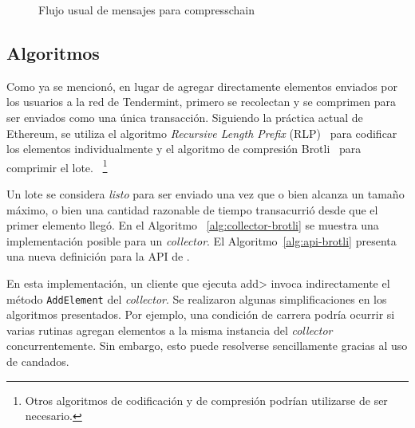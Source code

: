 \begin{figure}
  \caption{Flujo usual de mensajes para compresschain}
  \label{fig:compresschain-flow}
\end{figure}

\subsection{Algoritmos}


%
%

%

Como ya se mencionó, en lugar de agregar directamente elementos enviados por los usuarios a la red de Tendermint,
primero se recolectan y se comprimen para ser enviados como una única transacción.
Siguiendo la práctica actual de Ethereum, se utiliza el algoritmo
\textit{Recursive Length Prefix} (RLP)~\cite{ethereum} para codificar los elementos individualmente
y el algoritmo de compresión Brotli~\cite{brotli.compressor} para comprimir el lote.
~\footnote{ Otros algoritmos de codificación y de compresión podrían utilizarse de ser necesario.}

%
Un lote se considera \textit{listo} para ser enviado una vez que o bien alcanza un tamaño máximo,
o bien una cantidad razonable de tiempo transacurrió desde que el primer elemento llegó. 
%
En el Algoritmo ~\ref{alg:collector-brotli} se muestra una implementación posible para un \textit{collector}.
El Algoritmo~\ref{alg:api-brotli} presenta una nueva definición para la API de \setchain.





%
En esta implementación, un cliente que ejecuta \<add> invoca indirectamente el método \texttt{AddElement}
del \textit{collector}.
%
Se realizaron algunas simplificaciones en los algoritmos presentados. Por ejemplo, una condición de carrera
podría ocurrir si varias rutinas agregan elementos a la misma instancia del \textit{collector} concurrentemente.
Sin embargo, esto puede resolverse sencillamente gracias al uso de candados.



